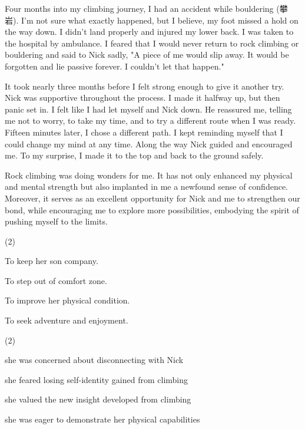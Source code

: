 \documentclass{英语试卷}
\begin{document}
\par Four months into my climbing journey, I had an accident while bouldering (攀岩). I'm not sure what exactly happened, but I believe, my foot missed a hold on the way down. I didn't land properly and injured my lower back. I was taken to the hospital by ambulance. I feared that I would never return to rock climbing or bouldering and said to Nick sadly, "A piece of me would slip away. It would be forgotten and lie passive forever. I couldn't let that happen."\par
\par It took nearly three months before I felt strong enough to give it another try. Nick was supportive throughout the process. I made it halfway up, but then panic set in. I felt like I had let myself and Nick down. He reassured me, telling me not to worry, to take my time, and to try a different route when I was ready. Fifteen minutes later, I chose a different path. I kept reminding myself that I could change my mind at any time. Along the way Nick guided and encouraged me. To my surprise, I made it to the top and back to the ground safely.\par
\par Rock climbing was doing wonders for me. It has not only enhanced my physical and mental strength but also implanted in me a newfound sense of confidence. Moreover, it serves as an excellent opportunity for Nick and me to strengthen our bond, while encouraging me to explore more possibilities, embodying the spirit of pushing myself to the limits.\par
{}
\begin{choices}(2)
  \item To keep her son company.
  \item To step out of comfort zone.
  \item To improve her physical condition.
  \item To seek adventure and enjoyment.
\end{choices}
\begin{choices}(2)
  \item she was concerned about disconnecting with Nick
  \item she feared losing self-identity gained from climbing
  \item she valued the new insight developed from climbing
  \item she was eager to demonstrate her physical capabilities
\end{choices}
\end{document}
